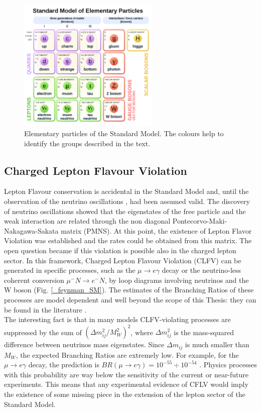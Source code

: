 \documentclass[12pt,a4paper,openright, oneside, titlepage]{book} %
\begin{document}
\begin{figure}[h!]
\centering
\includegraphics[width =0.6\textwidth, keepaspectratio]{SM}
\caption[Elementary particles of the Standard Model]{Elementary particles of the Standard Model. 
The colours help to identify the groups described in the text.}
\label{_SM}
\end{figure}

\subsection{Charged Lepton Flavour Violation}
Lepton Flavour conservation is accidental in the Standard Model and, until the observation of the neutrino oscillations  \cite{oscillations}, had been assumed valid. 
The discovery of neutrino oscillations showed that the eigenstates of the free particle and the weak  interaction are related through the non diagonal Pontecorvo-Maki-Nakagawa-Sakata matrix (PMNS).
At this point, the existence of  Lepton Flavor Violation was established and the rates could be obtained from this matrix.
The open question became if this violation is possible also in the charged lepton sector. 
In this framework, Charged Lepton Flavour Violation (CLFV) can be generated in specific processes, such as the $\mu\rightarrow e\gamma$ decay or the neutrino-less coherent conversion $\mu^-N \rightarrow e^-N$, by loop diagrams involving neutrinos and the W boson (Fig. \ref{_feynman_SM}).
The estimates of the Branching Ratios of these processes are model dependent and well beyond the scope of this Thesis:  they can be found in the literature  \cite{Signorelli}. \\
The interesting fact is that in many models CLFV-violating processes are suppressed by the sum of $(\Delta m_{ij}^2/M_W^2)^2$, where $\Delta m_{ij}^2$ is the mass-squared difference between neutrinos mass eigenstates. 
Since $\Delta m_{ij}$ is much smaller than $M_W$, the expected Branching Ratios are extremely low. 
For example, for the $\mu\rightarrow e\gamma$ decay, the prediction is $BR(\mu\rightarrow e\gamma)= 10^{-55}\div10^{-54}$ \cite {Petcov}. 
Physics processes with this probability are way below the sensitivity of the current or near-future experiments.
This means that any experimental evidence of CFLV would imply the existence of some missing piece in the extension of the lepton sector of the Standard Model.
\end{document}
